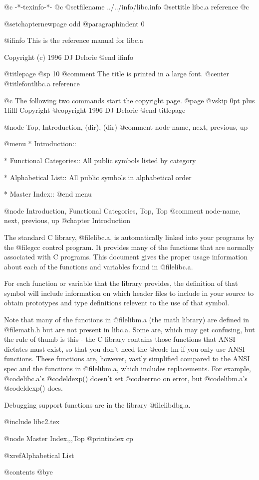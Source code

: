    @c -*-texinfo-*-
@c %
@setfilename ../../info/libc.info
@settitle libc.a reference
@c %

@setchapternewpage odd
@paragraphindent 0

@ifinfo
This is the reference manual for libc.a

Copyright (c) 1996 DJ Delorie
@end ifinfo

@titlepage
@sp 10
@comment The title is printed in a large font.
@center @titlefont{libc.a reference}

@c The following two commands start the copyright page.
@page
@vskip 0pt plus 1filll
Copyright @copyright{} 1996 DJ Delorie
@end titlepage

@node    Top,       Introduction,  (dir),    (dir)
@comment node-name, next,          previous, up

@menu
* Introduction::

* Functional Categories::  All public symbols listed by
                           category

* Alphabetical List::      All public symbols in alphabetical
                           order

* Master Index::
@end menu

@node    Introduction, Functional Categories, Top,      Top
@comment node-name,    next,                  previous, up
@chapter Introduction

The standard C library, @file{libc.a}, is automatically linked into your
programs by the @file{gcc} control program.  It provides many of the
functions that are normally associated with C programs.  This document
gives the proper usage information about each of the functions and
variables found in @file{libc.a}. 

For each function or variable that the library provides, the definition
of that symbol will include information on which header files to include
in your source to obtain prototypes and type definitions relevent to the
use of that symbol. 

Note that many of the functions in @file{libm.a} (the math library) are
defined in @file{math.h} but are not present in libc.a.  Some are, which
may get confusing, but the rule of thumb is this - the C library
contains those functions that ANSI dictates must exist, so that you
don't need the @code{-lm} if you only use ANSI functions.  These
functions are, however, vastly simplified compared to the ANSI spec and
the functions in @file{libm.a}, which includes replacements.  For
example, @code{libc.a}'s @code{ldexp()} doesn't set @code{errno} on
error, but @code{libm.a}'s @code{ldexp()} does.

Debugging support functions are in the library @file{libdbg.a}.

@include libc2.tex

@node Master Index,,,Top
@printindex cp

@xref{Alphabetical List}

@contents
@bye

